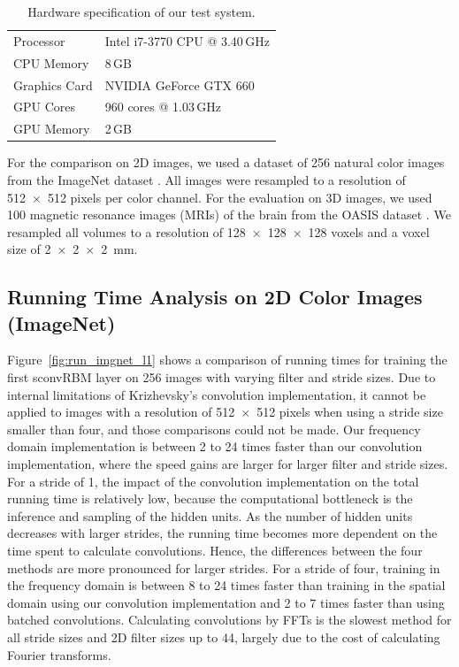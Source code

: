 \begin{table} 
\centering
\caption{Hardware specification of our test system.}
\label{tab:hardware}
\begin{tabular} {ll}
\toprule
Processor & Intel i7-3770 CPU @ 3.40\,GHz \\
CPU Memory & 8\,GB \\
\addlinespace
Graphics Card & NVIDIA GeForce GTX 660 \\
GPU Cores & 960 cores @ 1.03\,GHz \\
GPU Memory & 2\,GB \\
\bottomrule
\end{tabular}
\end{table}

For the comparison on 2D images, we used a dataset of 256 natural color images
from the ImageNet dataset \citep{deng2009}. All images were resampled to a resolution
of \num{512x512} pixels per color channel. For the evaluation on 3D images, we
used 100 magnetic resonance images (MRIs) of the brain from the OASIS dataset
\citep{Marcus2007}. We resampled all volumes to a resolution of
\num{128x128x128} voxels and a voxel size of \SI{2x2x2}{\milli\metre}.

\subsection{Running Time Analysis on 2D Color Images (ImageNet)}

Figure~\ref{fig:run_imgnet_l1} shows a comparison of running times for training
the first sconvRBM layer on 256 images with varying filter and stride sizes.
Due to internal limitations of Krizhevsky's convolution implementation, it
cannot be applied to images with a resolution of \num{512x512} pixels when using
a stride size smaller than four, and those comparisons could not be made. Our
frequency domain implementation is between 2 to 24 times faster than our
convolution implementation, where the speed gains are larger for larger filter
and stride sizes. For a stride of 1, the impact of the convolution
implementation on the total running time is relatively low, because the
computational bottleneck is the inference and sampling of the hidden
units.
As the number of hidden units decreases with larger strides, the running time
becomes more dependent on the time spent to calculate convolutions.
Hence, the differences between the four methods are more pronounced for larger
strides. For a stride of four, training in the frequency domain is between 8 to
24 times faster than training in the spatial domain using our convolution
implementation and 2 to 7 times faster than using batched convolutions.
Calculating convolutions by FFTs is the slowest method for all stride sizes and
2D filter sizes up to 44, largely due to the cost of calculating Fourier
transforms.


